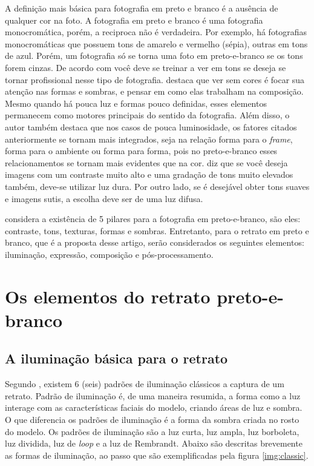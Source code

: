 \documentclass[
	article,			%
	12pt,				%
	oneside,			%
	a4paper,			%
	english,			%
	brazil,				%
	sumario=tradicional
	]{abntex2}
\begin{document}
A definição mais básica para fotografia em preto e branco é a ausência de qualquer cor na foto. A fotografia em preto e branco é uma fotografia monocromática, porém, a reciproca não é verdadeira. Por exemplo, há fotografias monocromáticas que possuem tons de amarelo e vermelho (sépia), outras em tons de azul. Porém, um fotografia só se torna uma foto em preto-e-branco se os tons forem cinzas. De acordo com  você deve se treinar a ver em tons se deseja se tornar profissional nesse tipo de fotografia.  destaca que ver sem cores é focar sua atenção nas formas e  sombras, e pensar em como elas trabalham na composição. Mesmo quando há pouca luz e formas pouco definidas, esses elementos permanecem como motores principais do sentido da fotografia. Além disso, o autor também destaca que nos casos de pouca luminosidade, os fatores citados anteriormente se tornam mais integrados, seja na relação forma para o \textit{frame}, forma para o ambiente ou forma para forma, pois no preto-e-branco esses relacionamentos se tornam mais evidentes que na cor.
 diz que se você deseja imagens com um contraste muito alto e uma gradação de tons muito elevados também, deve-se utilizar luz dura. Por outro lado, se é desejável obter tons suaves e imagens sutis, a escolha deve ser de uma luz difusa.

 considera a existência de 5 pilares para a fotografia em preto-e-branco, são eles: contraste, tons, texturas, formas e sombras. Entretanto, para o retrato em preto e branco, que é a proposta desse artigo, serão considerados os seguintes elementos: iluminação, expressão, composição e pós-processamento.

\section{Os elementos do retrato preto-e-branco}

\subsection{A iluminação básica para o retrato}

Segundo , existem 6 (seis) padrões de iluminação clássicos a captura de um retrato. Padrão de iluminação é, de uma maneira resumida, a forma como a luz interage com as características faciais do modelo, criando áreas de luz e sombra. 
O que diferencia os padrões de iluminação é a forma da sombra criada no rosto do modelo. Os padrões de iluminação são a luz curta, luz ampla, luz borboleta, luz dividida, luz de \textit{loop} e a luz de Rembrandt. Abaixo são descritas brevemente as formas de iluminação, ao passo que são exemplificadas pela figura \ref{img:classic}.
\end{document}

